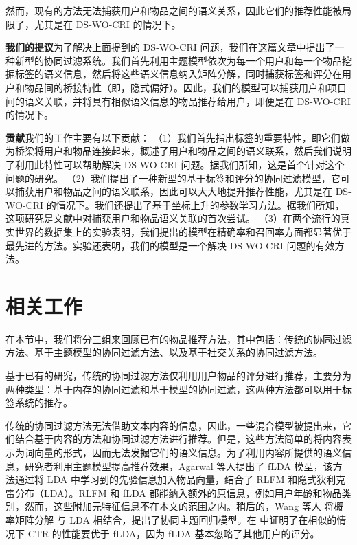然而，现有的方法无法捕获用户和物品之间的语义关系，因此它们的推荐性能被局限了，尤其是在 DS-WO-CRI 的情况下。


\textbf{我们的提议}\quad 为了解决上面提到的 DS-WO-CRI 问题，我们在这篇文章中提出了一种新型的协同过滤系统。我们首先利用主题模型依次为每一个用户和每一个物品挖掘标签的语义信息，然后将这些语义信息纳入矩阵分解，同时捕获标签和评分在用户和物品间的桥接特性（即，隐式偏好）。因此，我们的模型可以捕获用户和项目间的语义关联，并将具有相似语义信息的物品推荐给用户，即便是在 DS-WO-CRI 的情况下。

\textbf{贡献}\quad 我们的工作主要有以下贡献：
（1）我们首先指出标签的重要特性，即它们做为桥梁将用户和物品连接起来，概述了用户和物品之间的语义联系，然后我们说明了利用此特性可以帮助解决 DS-WO-CRI 问题。据我们所知，这是首个针对这个问题的研究。
（2）我们提出了一种新型的基于标签和评分的协同过滤模型，它可以捕获用户和物品之间的语义联系，因此可以大大地提升推荐性能，尤其是在 DS-WO-CRI 的情况下。我们还提出了基于坐标上升的参数学习方法。据我们所知，这项研究是文献中对捕获用户和物品语义关联的首次尝试。
（3）在两个流行的真实世界的数据集上的实验表明，我们提出的模型在精确率和召回率方面都显著优于最先进的方法。实验还表明，我们的模型是一个解决 DS-WO-CRI 问题的有效方法。


\chapter{相关工作}
在本节中，我们将分三组来回顾已有的物品推荐方法，其中包括：传统的协同过滤方法、基于主题模型的协同过滤方法、以及基于社交关系的协同过滤方法。

基于已有的研究\cite{shi2014collaborative}，传统的协同过滤方法仅利用用户物品的评分进行推荐，主要分为两种类型：基于内存的协同过滤\cite{deshpande2004item}和基于模型的协同过滤\cite{Koren2009Matrix,Koren2008Factorization,Zhou2009TagRec,Xu2015Ice}，这两种方法都可以用于标签系统的推荐。

传统的协同过滤方法无法借助文本内容的信息，因此，一些混合模型被提出来，它们结合基于内容的方法和协同过滤方法进行推荐\cite{Melville2002Content}。但是，这些方法简单的将内容表示为词向量的形式，因而无法发掘它们的语义信息。为了利用内容所提供的语义信息，研究者利用主题模型提高推荐效果，Agarwal 等人提出了 fLDA 模型\cite{Agarwal2010fLDA}，该方法通过将 LDA 中学习到的先验信息加入物品向量，结合了 RLFM\cite{Agarwal2010fLDA} 和隐式狄利克雷分布（LDA）。RLFM 和 fLDA 都能纳入额外的原信息，例如用户年龄和物品类别，然而，这些附加元特征信息不在本文的范围之内。稍后的，Wang 等人\cite{Wang2011Collaborative} 将概率矩阵分解\cite{Salakhutdinov2008Probabilistic} 与 LDA \cite{Blei2003Latent} 相结合，提出了协同主题回归模型。在\cite{Wang2011Collaborative} 中证明了在相似的情况下 CTR 的性能要优于 fLDA，因为 fLDA 基本忽略了其他用户的评分。

